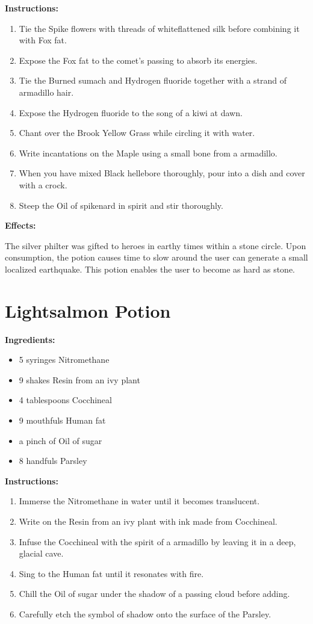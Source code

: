 \documentclass{article}
\begin{document}
\textbf{Instructions:}

\begin{enumerate}
  \item Tie the Spike flowers with threads of whiteflattened silk before combining it with Fox fat.
  \item Expose the Fox fat to the comet’s passing to absorb its energies.
  \item Tie the Burned sumach and Hydrogen fluoride together with a strand of armadillo hair.
  \item Expose the Hydrogen fluoride to the song of a kiwi at dawn.
  \item Chant over the Brook Yellow Grass while circling it with water.
  \item Write incantations on the Maple using a small bone from a armadillo.
  \item When you have mixed Black hellebore thoroughly, pour into a dish and cover with a crock.
  \item Steep the Oil of spikenard in spirit and stir thoroughly.
\end{enumerate}

\textbf{Effects:}

The silver philter was gifted to heroes in earthy times within a stone circle. Upon consumption, the potion causes time to slow around the user can generate a small localized earthquake. This potion enables the user to become as hard as stone.

\newpage
\section*{Lightsalmon Potion}

\textbf{Ingredients:}

\begin{itemize}
  \item 5 syringes Nitromethane
  \item 9 shakes Resin from an ivy plant
  \item 4 tablespoons Cocchineal
  \item 9 mouthfuls Human fat
  \item a pinch of Oil of sugar
  \item 8 handfuls Parsley
\end{itemize}

\textbf{Instructions:}

\begin{enumerate}
  \item Immerse the Nitromethane in water until it becomes translucent.
  \item Write on the Resin from an ivy plant with ink made from Cocchineal.
  \item Infuse the Cocchineal with the spirit of a armadillo by leaving it in a deep, glacial cave.
  \item Sing to the Human fat until it resonates with fire.
  \item Chill the Oil of sugar under the shadow of a passing cloud before adding.
  \item Carefully etch the symbol of shadow onto the surface of the Parsley.
\end{enumerate}
\end{document}
